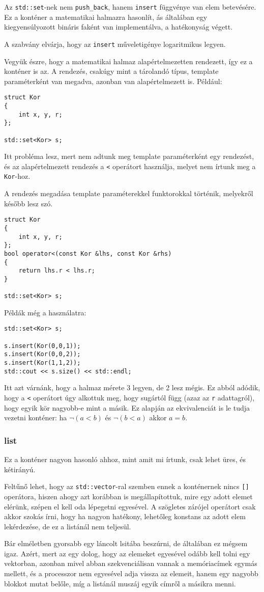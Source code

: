 \documentclass[a4paper,11.5pt]{article}
\begin{document}
	\smallskip
	Az \texttt{std::set}-nek nem \texttt{push\_back}, hanem \texttt{insert} függvénye van elem betevésére. Ez a konténer a matematikai halmazra hasonlít, ás általában egy kiegyensúlyozott bináris faként van implementálva, a hatékonyság végett.
	\begin{note}
		A szabvány elvárja, hogy az \texttt{insert} műveletigénye logaritmikus legyen.
	\end{note}
	Vegyük észre, hogy a matematikai halmaz alapértelmezetten rendezett, így ez a konténer is az. A rendezés, csakúgy mint a tárolandó típus, template paraméterként van megadva, azonban van alapértelmezett is. Például:
	\begin{lstlisting}
struct Kor
{
	int x, y, r;
};

std::set<Kor> s;
	\end{lstlisting}
	Itt probléma lesz, mert nem adtunk meg template paraméterként egy rendezést, és az alapértelmezett rendezés a \texttt{<} operátort használja, melyet nem írtunk meg a \texttt{Kor}-hoz.
	\begin{note}
		A rendezés megadása template paraméterekkel funktorokkal történik, melyekről később lesz szó.
	\end{note}
	\begin{lstlisting}
struct Kor
{
	int x, y, r;
};
bool operator<(const Kor &lhs, const Kor &rhs)
{
	return lhs.r < lhs.r;
}

std::set<Kor> s;
	\end{lstlisting}
	Példák még a használatra:
\begin{lstlisting}
std::set<Kor> s;

s.insert(Kor(0,0,1));
s.insert(Kor(0,0,2));
s.insert(Kor(1,1,2));
std::cout << s.size() << std::endl;
\end{lstlisting}
	Itt azt várnánk, hogy a halmaz mérete 3 legyen, de 2 lesz mégis. Ez abból adódik, hogy a \texttt{<} operátort úgy alkottuk meg, hogy sugártól függ (azaz az \texttt{r} adattagról), hogy egyik kör nagyobb-e mint a másik. Ez alapján az ekvivalenciát is le tudja vezetni konténer: ha $\neg(a<b)$ és $\neg(b<a)$ akkor $a=b$.
	\subsubsection{list}
	Ez a konténer nagyon hasonló ahhoz, mint amit mi írtunk, csak lehet üres, és kétirányú. 
	\smallskip
	
	Feltűnő lehet, hogy az \texttt{std::vector}-ral szemben ennek a konténernek nincs \texttt{[]} operátora, hiszen ahogy azt korábban is megállapítottuk, mire egy adott elemet elérünk, szépen el kell oda lépegetni egyesével. A szögletes zárójel operátort csak akkor szokás írni, hogy ha nagyon hatékony, lehetőleg konstans az adott elem lekérdezése, de ez a listánál nem teljesül.
	\begin{note}
		Bár elméletben gyorsabb egy láncolt lsitába beszúrni, de általában ez mégsem igaz. Azért, mert az egy dolog, hogy az elemeket egyesével odább kell tolni egy vektorban, azonban mivel abban szekvenciálisan vannak a memóriacímek egymás mellett, és a processzor nem egyesével adja vissza az elemeit, hanem egy nagyobb blokkot mutat belőle, míg a listánál muszáj egyik címről a másikra menni.
	\end{note}
	
\end{document}
